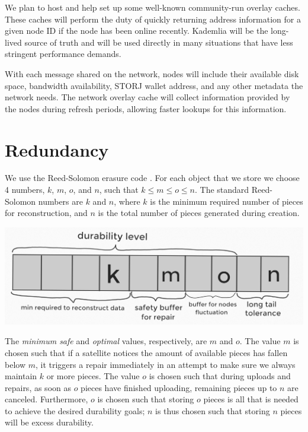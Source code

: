 \documentclass[11pt,fleqn,openany]{book}
\begin{document}
We plan to host and help set up some well-known community-run overlay caches.
These caches will perform the duty of quickly returning address information
for a given node ID if the node has been online recently. Kademlia will be the
long-lived source of truth and will be used directly in many situations that
have less stringent performance demands.

With each message shared on the network, nodes will include their available
disk space, bandwidth availability, STORJ wallet address, and any other
metadata the network needs.
The network overlay cache will collect information provided by the nodes
during refresh periods, allowing faster lookups for this information.

\section{Redundancy}\label{sec:concrete-redundancy}

We use the Reed-Solomon erasure code \cite{rs}. For each object that we store
we choose 4 numbers, $k$, $m$, $o$, and $n$, such that $k\le m\le o\le n$.
The standard Reed-Solomon numbers are $k$ and $n$, where $k$ is the minimum
required number of pieces for reconstruction, and $n$ is the total number of
pieces generated during creation.

\begin{center}
\includegraphics[width=\textwidth]{diagram-drafts/redundancy_kmon.png}
\end{center}

The {\em minimum safe} and {\em optimal} values, respectively, are $m$ and $o$. The
value $m$ is chosen such that if a satellite notices the amount of available pieces
has fallen below $m$, it triggers a repair
immediately in an attempt to make sure we always maintain
$k$ or more pieces. The value $o$ is chosen such that during uploads and repairs,
as soon as $o$ pieces have finished uploading, remaining pieces up to $n$ are
canceled.
Furthermore, $o$ is chosen such that storing $o$ pieces is all that is
needed to achieve the desired durability goals; $n$ is thus chosen such that
storing $n$ pieces will be excess durability.
\end{document}
